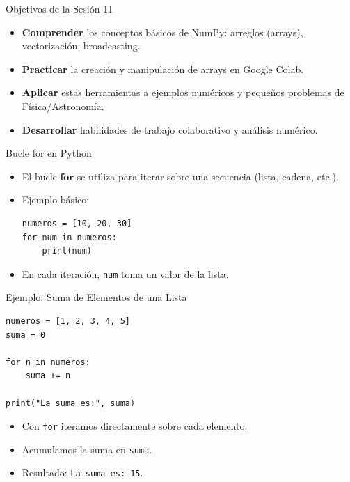 \documentclass[10pt]{beamer}
\begin{document}
\begin{frame}{Objetivos de la Sesión 11}
  \begin{itemize}
    \item \textbf{Comprender} los conceptos básicos de NumPy: arreglos (arrays), vectorización, broadcasting.
    \item \textbf{Practicar} la creación y manipulación de arrays en Google Colab.
    \item \textbf{Aplicar} estas herramientas a ejemplos numéricos y pequeños problemas de Física/Astronomía.
    \item \textbf{Desarrollar} habilidades de trabajo colaborativo y análisis numérico.
  \end{itemize}
\end{frame}


\begin{frame}[fragile]{Bucle for en Python}
  \begin{itemize}
    \item El bucle \textbf{for} se utiliza para iterar sobre una secuencia (lista, cadena, etc.).
    \item Ejemplo básico:
    \begin{verbatim}
numeros = [10, 20, 30]
for num in numeros:
    print(num)
    \end{verbatim}
    \item En cada iteración, \texttt{num} toma un valor de la lista.
  \end{itemize}
\end{frame}

\begin{frame}[fragile]{Ejemplo: Suma de Elementos de una Lista}
  \begin{verbatim}
numeros = [1, 2, 3, 4, 5]
suma = 0

for n in numeros:
    suma += n

print("La suma es:", suma)
  \end{verbatim}
  \begin{itemize}
    \item Con \texttt{for} iteramos directamente sobre cada elemento.
    \item Acumulamos la suma en \texttt{suma}.
    \item Resultado: \texttt{La suma es: 15}.
  \end{itemize}
\end{frame}
\end{document}
